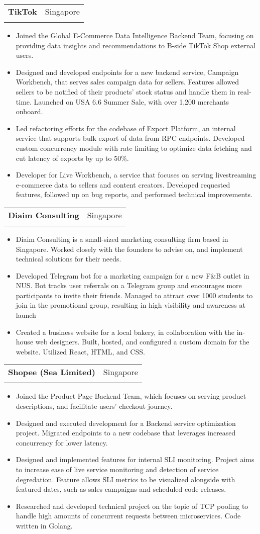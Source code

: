 \documentclass[letterpaper,11pt]{article}
\makeatletter
\newcommand{\resumeItem}[1]{
  \item\small{
    {#1 \vspace{-2pt}}
  }
}
\newcommand{\resumeSubheading}[4]{
  \vspace{-2pt}\item
    \begin{tabular*}{0.97\textwidth}[t]{l@{\extracolsep{\fill}}r}
      \textbf{#1} & #2 \\
      \text{\small#3} & \text{\small #4} \\
    \end{tabular*}\vspace{-7pt}
}
\newcommand{\resumeItemListStart}{\begin{itemize}}
\newcommand{\resumeItemListEnd}{\end{itemize}\vspace{-5pt}}
\makeatother
\begin{document}
    \resumeSubheading
      {TikTok}{Singapore}
      {Software Engineer, Intern}{Jan 2024 | Aug 2024}
        \resumeItemListStart
            \resumeItem{Joined the Global E-Commerce Data Intelligence Backend Team, focusing on providing data insights and recommendations to B-side TikTok Shop external users.}
            \resumeItem{Designed and developed endpoints for a new backend service, Campaign Workbench, that serves sales campaign data for sellers. Features allowed sellers to be notified of their products' stock status and handle them in real-time. Launched on USA 6.6 Summer Sale, with over 1,200 merchants onboard.}
            \resumeItem{Led refactoring efforts for the codebase of Export Platform, an internal service that supports bulk export of data from RPC endpoints. Developed custom concurrency module with rate limiting to optimize data fetching and cut latency of exports by up to 50\%.}
            \resumeItem{Developer for Live Workbench, a service that focuses on serving livestreaming e-commerce data to sellers and content creators. Developed requested features, followed up on bug reports, and performed technical improvements.}
        \resumeItemListEnd

    \resumeSubheading
      {Diaim Consulting}{Singapore}
      {Software Engineer, Freelance}{Jun 2023 | Aug 2023}
        \resumeItemListStart
            \resumeItem{Diaim Consulting is a small-sized marketing consulting firm based in Singapore. Worked closely with the founders to advise on, and implement technical solutions for their needs.}
            \resumeItem{Developed Telegram bot for a marketing campaign for a new F&B outlet in NUS. Bot tracks user referrals on a Telegram group and encourages more participants to invite their friends. Managed to attract over 1000 students to join in the promotional group, resulting in high visibility and awareness at launch}
            \resumeItem{Created a business website for a local bakery, in collaboration with the in-house web designers. Built, hosted, and configured a custom domain for the website. Utilized React, HTML, and CSS.}
        \resumeItemListEnd

    \resumeSubheading
      {Shopee (Sea Limited)}{Singapore}
      {Software Engineer, Intern}{Feb 2022 | Aug 2022}
        \resumeItemListStart
            \resumeItem{Joined the Product Page Backend Team, which focuses on serving product descriptions, and facilitate users' checkout journey.}
            \resumeItem{Designed and executed development for a Backend service optimization project. Migrated endpoints to a new codebase that leverages increased concurrency for lower latency.}
            \resumeItem{Designed and implemented features for internal SLI monitoring. Project aims to increase ease of live service monitoring and detection of service degredation. Feature allows SLI metrics to be visualized alongside with featured dates, such as sales campaigns and scheduled code releases.}
            \resumeItem{Researched and developed technical project on the topic of TCP pooling to handle high amounts of concurrent requests between microservices. Code written in Golang.}
        \resumeItemListEnd
    
\end{document}
